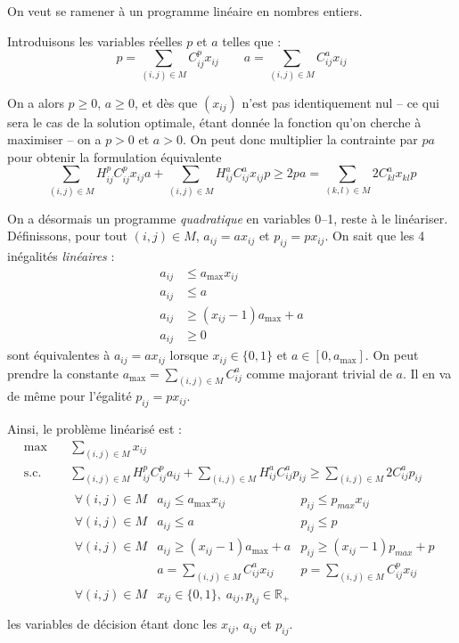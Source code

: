 \documentclass[a4paper,11pt] {article}
\begin{document}
On veut se ramener à un programme linéaire en nombres entiers. 

Introduisons les variables réelles $p$ et $a$ telles que :
\[ p = \sum_{(i,j)\in M} C^p_{ij}x_{ij} \qquad a = \sum_{(i,j)\in M} C^a_{ij}x_{ij} \]

On a alors $p \geq 0$, $a \geq 0$, et dès que $(x_{ij})$ n'est pas
identiquement nul -- ce qui sera le cas de la solution optimale, étant
donnée la fonction qu'on cherche à maximiser -- on a $p > 0$ et
$a > 0$. On peut donc multiplier la contrainte par $pa$ pour obtenir
la formulation équivalente
\[ \sum_{(i,j)\in M} H^p_{ij}C^p_{ij}x_{ij}a + \sum_{(i,j)\in M} H^a_{ij}C^a_{ij}x_{ij}p
\geq 2pa = \sum_{(k,l)\in M} 2C^a_{kl}x_{kl}p
\]

On a désormais un programme \textit{quadratique} en variables 0--1,
reste à le linéariser. Définissons, pour tout $(i,j)\in M$,
$a_{ij}=ax_{ij}$ et $p_{ij}=px_{ij}$. On sait que les 4 inégalités
\textit{linéaires} :
\begin{align*}
a_{ij} &\leq a_{\mathrm{max}}x_{ij}\\
a_{ij} &\leq a\\
a_{ij} &\geq (x_{ij}-1)a_{\mathrm{max}}+a\\
a_{ij} &\geq 0
\end{align*}
sont équivalentes à $a_{ij} = ax_{ij}$ lorsque $x_{ij} \in \{0,1\}$ et
$a \in [0,a_{\textrm{max}}]$. On peut prendre la constante
$a_{\mathrm{max}} = \sum_{(i,j)\in M} C^a_{ij}$ comme majorant trivial
de $a$. Il en va de même pour l'égalité $p_{ij}=px_{ij}$.

Ainsi, le problème linéarisé est : 
\begin{align*}
\max &\quad \sum_{(i,j)\in M} x_{ij}\\
\text{s.c.} &\quad  \sum_{(i,j)\in M} H^p_{ij}C^p_{ij}a_{ij} + \sum_{(i,j)\in M} H^a_{ij}C^a_{ij}p_{ij} \geq \sum_{(i,j)\in M} 2C^a_{ij}p_{ij}\\
&\quad  \begin{array}{lll}
    \forall{(i,j)} \in M&a_{ij}\leq a_{\mathrm{max}}x_{ij}&p_{ij}\leq p_{max}x_{ij}\\
    \forall{(i,j)} \in M&a_{ij}\leq a&p_{ij}\leq p\\
    \forall{(i,j)} \in M&a_{ij}\geq (x_{ij}-1)a_{\mathrm{max}}+a&p_{ij}\geq (x_{ij}-1)p_{max}+p\\
                        &a = \displaystyle\sum_{(i,j)\in M} C^a_{ij}x_{ij}&p = \displaystyle\sum_{(i,j)\in M} C^p_{ij}x_{ij}\\
    \forall{(i,j)} \in M & x_{ij} \in \{0,1\},\; a_{ij}, p_{ij} \in \mathbb{R}_+ \\
	\end{array}
\end{align*}
les variables de décision étant donc les $x_{ij}$, $a_{ij}$ et $p_{ij}$.
\end{document}

